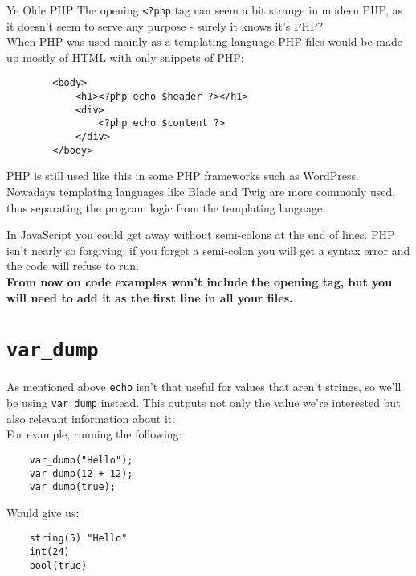 \begin{infobox}{Ye Olde PHP}
    The opening \texttt{<?php} tag can seem a bit strange in modern PHP, as it doesn't seem to serve any purpose - surely it knows it's PHP?
    \\

    When PHP was used mainly as a templating language PHP files would be made up mostly of HTML with only snippets of PHP:

    \begin{verbatim}
        <body>
            <h1><?php echo $header ?></h1>
            <div>
                <?php echo $content ?>
            </div>
        </body>
    \end{verbatim}

    PHP is still used like this in some PHP frameworks such as WordPress. Nowadays templating languages like Blade and Twig are more commonly used, thus separating the program logic from the templating language.
\end{infobox}

In JavaScript you could get away without semi-colons at the end of lines. PHP isn't nearly so forgiving: if you forget a semi-colon you will get a syntax error and the code will refuse to run.
\\

\textbf{From now on code examples won't include the opening tag, but you will need to add it as the first line in all your files.}


\section{\texttt{var\_dump}}

As mentioned above \texttt{echo} isn't that useful for values that aren't strings, so we'll be using \texttt{var\_dump} instead. This outputs not only the value we're interested but also relevant information about it.
\\

For example, running the following:

\begin{verbatim}
    var_dump("Hello");
    var_dump(12 + 12);
    var_dump(true);
\end{verbatim}

Would give us:

\begin{verbatim}
    string(5) "Hello"
    int(24)
    bool(true)
\end{verbatim}

